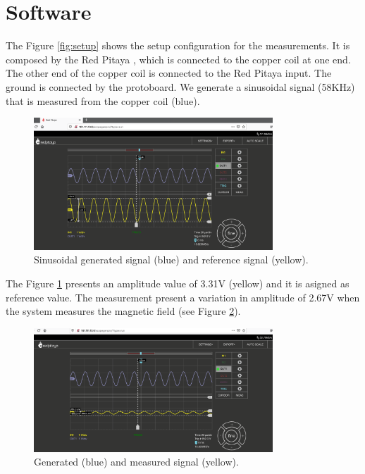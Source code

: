 \documentclass[12pt]{extarticle}
\begin{document}
\section{Software}

The Figure \ref{fig:setup} shows the setup configuration for the measurements. It is composed by the Red Pitaya \cite{redpitaya}, which is connected to the copper coil  at one end. The other end of the copper coil is connected to the Red Pitaya input. The ground is connected by the protoboard. We generate a sinusoidal signal (58KHz) that is measured from the copper coil (blue). 

\begin{figure}[!h]
	\begin{center}
		\includegraphics[width=0.8\textwidth]{images2/measurement1} 
		\caption{Sinusoidal generated signal (blue) and reference signal (yellow).}
		\label{fig:m1}
	\end{center}
\end{figure}

The Figure \ref{fig:m1} presents an amplitude value of  3.31V (yellow) and it is asigned as reference value. The measurement present a variation in amplitude of 2.67V when the system measures the magnetic field (see Figure \ref{fig:m2}).

\begin{figure}[!h]
	\begin{center}
		\includegraphics[width=0.8\textwidth]{images2/measurement2} 
		\caption{Generated (blue) and measured signal (yellow).}
		\label{fig:m2}
	\end{center}
\end{figure}
\end{document}
